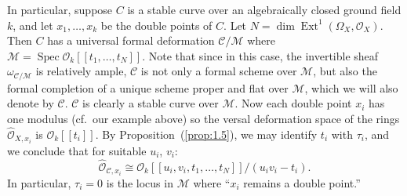 \documentclass[10pt]{amsart}
\theoremstyle{plain}
\theoremstyle{definition}
\DeclareMathOperator{\Ext}{Ext}
\DeclareMathOperator{\Spec}{Spec}
\newcommand{\cO}{\mathcal{O}}
\begin{document}
In particular, suppose $C$ is a stable curve over an algebraically closed ground field $k$, and let $x_1, \ldots, x_k$ be the double points of $C$. Let $N = \dim \Ext^1(\Omega_X, \cO_X)$. Then $C$ has a universal formal deformation $\mathscr{C}/\mathscr{M}$ where $\mathscr{M} = \Spec \mathcal{O}_k[[t_1, \ldots, t_N]]$. Note that since in this case, the invertible sheaf $\omega_{\mathscr{C}/\mathscr{M}}$ is relatively ample, $\mathscr{C}$ is not only a formal scheme over $\mathscr{M}$, but also the formal completion of a unique scheme proper and flat over $\mathscr{M}$, which we will also denote by $\mathscr{C}$. $\mathscr{C}$ is clearly a stable curve over $\mathscr{M}$. Now each double point $x_i$ has one modulus (cf.~our example above) so the versal deformation space of the rings $\widehat{\cO}_{X,x_i}$ is $\mathcal{O}_k[[t_i]]$. By Proposition~(\ref{prop:1.5}), we may identify $t_i$ with $\tau_i$, and we conclude that for suitable $u_i$, $v_i$:
\[
\widehat{\cO}_{\mathscr{C},x_i} \cong \mathcal{O}_k[[u_i, v_i, t_1, \ldots, t_N]]/(u_i v_i - t_i).
\]
In particular, $\tau_i = 0$ is the locus in $\mathscr{M}$ where ``$x_i$ remains a double point.''
\end{document}
